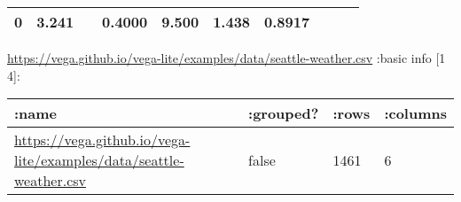 \documentclass[]{article}
\begin{document}
\begin{longtable}[]{@{}llllllllll@{}}
\begin{minipage}[t]{0.07\columnwidth}
0\strut
\end{minipage} & \begin{minipage}[t]{0.07\columnwidth}\raggedright\strut
3.241\strut
\end{minipage} & \begin{minipage}[t]{0.04\columnwidth}\raggedright\strut
\strut
\end{minipage} & \begin{minipage}[t]{0.07\columnwidth}\raggedright\strut
0.4000\strut
\end{minipage} & \begin{minipage}[t]{0.07\columnwidth}\raggedright\strut
9.500\strut
\end{minipage} & \begin{minipage}[t]{0.12\columnwidth}\raggedright\strut
1.438\strut
\end{minipage} & \begin{minipage}[t]{0.05\columnwidth}\raggedright\strut
0.8917\strut
\end{minipage}\tabularnewline
\bottomrule
\end{longtable}

\url{https://vega.github.io/vega-lite/examples/data/seattle-weather.csv}
:basic info {[}1 4{]}:

\begin{longtable}[]{@{}llll@{}}
\toprule
\begin{minipage}[b]{0.61\columnwidth}\raggedright\strut
:name\strut
\end{minipage} & \begin{minipage}[b]{0.11\columnwidth}\raggedright\strut
:grouped?\strut
\end{minipage} & \begin{minipage}[b]{0.07\columnwidth}\raggedright\strut
:rows\strut
\end{minipage} & \begin{minipage}[b]{0.10\columnwidth}\raggedright\strut
:columns\strut
\end{minipage}\tabularnewline
\midrule
\endhead
\begin{minipage}[t]{0.61\columnwidth}\raggedright\strut
\url{https://vega.github.io/vega-lite/examples/data/seattle-weather.csv}\strut
\end{minipage} & \begin{minipage}[t]{0.11\columnwidth}\raggedright\strut
false\strut
\end{minipage} & \begin{minipage}[t]{0.07\columnwidth}\raggedright\strut
1461\strut
\end{minipage} & \begin{minipage}[t]{0.10\columnwidth}\raggedright\strut
6\strut
\end{minipage}\tabularnewline
\bottomrule
\end{longtable}
\end{document}

